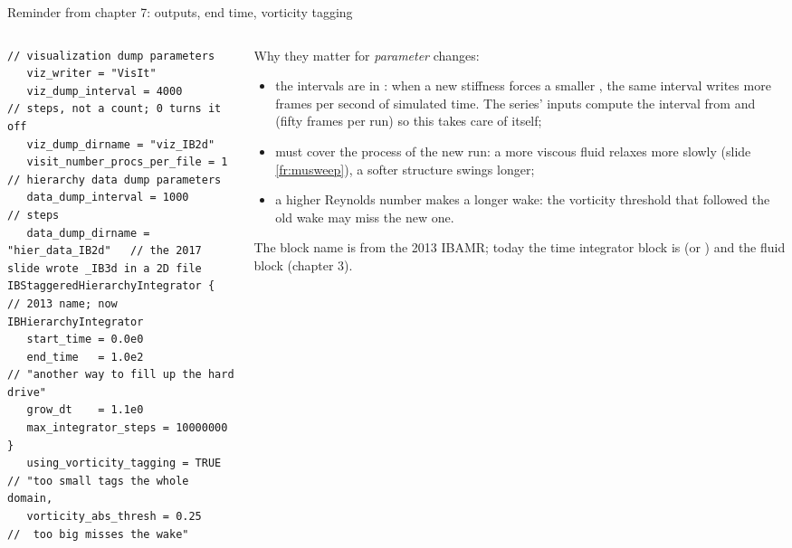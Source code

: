 \documentclass[aspectratio=169,11pt]{beamer}
\begin{document}
\begin{frame}[fragile]{Reminder from chapter 7: outputs, end time, vorticity tagging}
\label{fr:reminder2}
\begin{columns}[T,onlytextwidth]
\begin{column}{0.5\textwidth}
\begin{lstlisting}[style=inputtiny]
// visualization dump parameters
   viz_writer = "VisIt"
   viz_dump_interval = 4000            // steps, not a count; 0 turns it off
   viz_dump_dirname = "viz_IB2d"
   visit_number_procs_per_file = 1
// hierarchy data dump parameters
   data_dump_interval = 1000           // steps
   data_dump_dirname = "hier_data_IB2d"   // the 2017 slide wrote _IB3d in a 2D file
IBStaggeredHierarchyIntegrator {       // 2013 name; now IBHierarchyIntegrator
   start_time = 0.0e0
   end_time   = 1.0e2                  // "another way to fill up the hard drive"
   grow_dt    = 1.1e0
   max_integrator_steps = 10000000
}
   using_vorticity_tagging = TRUE      // "too small tags the whole domain,
   vorticity_abs_thresh = 0.25         //  too big misses the wake"
\end{lstlisting}
\end{column}
\begin{column}{0.48\textwidth}
\scriptsize Why they matter for \emph{parameter} changes:
\begin{itemize}
  \item the intervals are in : when a new stiffness forces a smaller , the same interval writes more frames per second of simulated time. The series' inputs compute the interval from  and  (fifty frames per run) so this takes care of itself;
  \item {} must cover the  process of the new run: a more viscous fluid relaxes more slowly (slide \ref{fr:musweep}), a softer structure swings longer;
  \item a higher Reynolds number makes a longer wake: the vorticity threshold that followed the old wake may miss the new one.
\end{itemize}
\scriptsize The block name  is from the 2013 IBAMR; today the time integrator block is  (or ) and the fluid block  (chapter 3).
\end{column}
\end{columns}
\end{frame}
\end{document}
